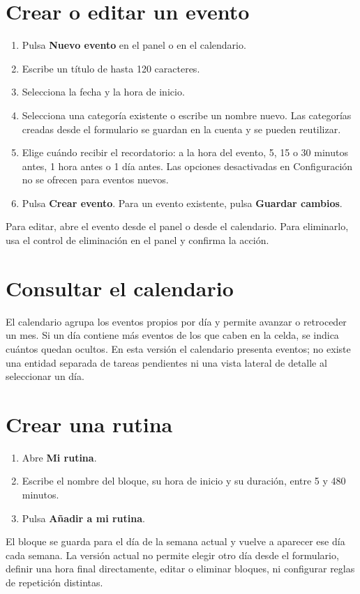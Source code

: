 \documentclass[12pt,a4paper]{article}
\begin{document}
\section{Crear o editar un evento}
\begin{enumerate}
  \item Pulsa \textbf{Nuevo evento} en el panel o en el calendario.
  \item Escribe un título de hasta 120 caracteres.
  \item Selecciona la fecha y la hora de inicio.
  \item Selecciona una categoría existente o escribe un nombre nuevo. Las categorías creadas desde el formulario se guardan en la cuenta y se pueden reutilizar.
  \item Elige cuándo recibir el recordatorio: a la hora del evento, 5, 15 o 30 minutos antes, 1 hora antes o 1 día antes. Las opciones desactivadas en Configuración no se ofrecen para eventos nuevos.
  \item Pulsa \textbf{Crear evento}. Para un evento existente, pulsa \textbf{Guardar cambios}.
\end{enumerate}
Para editar, abre el evento desde el panel o desde el calendario. Para eliminarlo, usa el control de eliminación en el panel y confirma la acción.

\section{Consultar el calendario}
El calendario agrupa los eventos propios por día y permite avanzar o retroceder un mes. Si un día contiene más eventos de los que caben en la celda, se indica cuántos quedan ocultos. En esta versión el calendario presenta eventos; no existe una entidad separada de tareas pendientes ni una vista lateral de detalle al seleccionar un día.

\section{Crear una rutina}
\begin{enumerate}
  \item Abre \textbf{Mi rutina}.
  \item Escribe el nombre del bloque, su hora de inicio y su duración, entre 5 y 480 minutos.
  \item Pulsa \textbf{Añadir a mi rutina}.
\end{enumerate}
El bloque se guarda para el día de la semana actual y vuelve a aparecer ese día cada semana. La versión actual no permite elegir otro día desde el formulario, definir una hora final directamente, editar o eliminar bloques, ni configurar reglas de repetición distintas.
\end{document}
